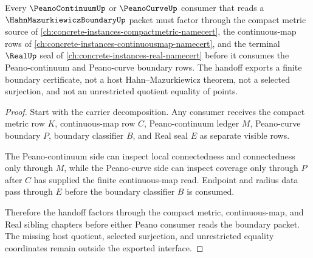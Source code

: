 \begin{theorem}
\label{thm:hahn-mazurkiewicz-boundary-peano-continuum-handoff}
Every $\PeanoContinuumUp$ or $\PeanoCurveUp$ consumer that reads a $\HahnMazurkiewiczBoundaryUp$ packet must factor through the compact metric source of \autoref{ch:concrete-instances-compactmetric-namecert}, the continuous-map rows of \autoref{ch:concrete-instances-continuousmap-namecert}, and the terminal $\RealUp$ seal of \autoref{ch:concrete-instances-real-namecert} before it consumes the Peano-continuum and Peano-curve boundary rows. The handoff exports a finite boundary certificate, not a host Hahn--Mazurkiewicz theorem, not a selected surjection, and not an unrestricted quotient equality of points.
\end{theorem}
\begin{proof}
Start with the carrier decomposition. Any consumer receives the compact metric row $K$, continuous-map row $C$, Peano-continuum ledger $M$, Peano-curve boundary $P$, boundary classifier $B$, and Real seal $E$ as separate visible rows.

The Peano-continuum side can inspect local connectedness and connectedness only through $M$, while the Peano-curve side can inspect coverage only through $P$ after $C$ has supplied the finite continuous-map read. Endpoint and radius data pass through $E$ before the boundary classifier $B$ is consumed.

Therefore the handoff factors through the compact metric, continuous-map, and Real sibling chapters before either Peano consumer reads the boundary packet. The missing host quotient, selected surjection, and unrestricted equality coordinates remain outside the exported interface.
\end{proof}

\begin{closurestatus}{\HahnMazurkiewiczBoundaryUp}
  \theoryclosure{\scopedClosure}
  \formalstatus{\unformalizedV}
\end{closurestatus}
